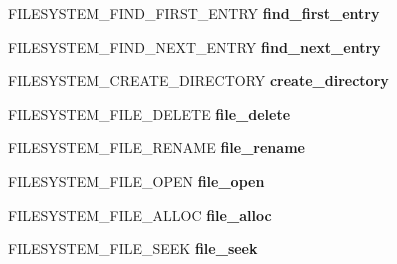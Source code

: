 \begin{DoxyCompactItemize}
\item 
\hypertarget{struct_f_i_l_e_s_y_s_t_e_m_a9abd7d16a342ddce70301d93b71037b1}{F\-I\-L\-E\-S\-Y\-S\-T\-E\-M\-\_\-\-F\-I\-N\-D\-\_\-\-F\-I\-R\-S\-T\-\_\-\-E\-N\-T\-R\-Y {\bfseries find\-\_\-first\-\_\-entry}}\label{struct_f_i_l_e_s_y_s_t_e_m_a9abd7d16a342ddce70301d93b71037b1}

\item 
\hypertarget{struct_f_i_l_e_s_y_s_t_e_m_a1075f67098ed5367a708608d7c8edad2}{F\-I\-L\-E\-S\-Y\-S\-T\-E\-M\-\_\-\-F\-I\-N\-D\-\_\-\-N\-E\-X\-T\-\_\-\-E\-N\-T\-R\-Y {\bfseries find\-\_\-next\-\_\-entry}}\label{struct_f_i_l_e_s_y_s_t_e_m_a1075f67098ed5367a708608d7c8edad2}

\item 
\hypertarget{struct_f_i_l_e_s_y_s_t_e_m_a0950a4bfe4c8d1585385c94ace362568}{F\-I\-L\-E\-S\-Y\-S\-T\-E\-M\-\_\-\-C\-R\-E\-A\-T\-E\-\_\-\-D\-I\-R\-E\-C\-T\-O\-R\-Y {\bfseries create\-\_\-directory}}\label{struct_f_i_l_e_s_y_s_t_e_m_a0950a4bfe4c8d1585385c94ace362568}

\item 
\hypertarget{struct_f_i_l_e_s_y_s_t_e_m_afab3332d6aec8b0be5071898e2e34352}{F\-I\-L\-E\-S\-Y\-S\-T\-E\-M\-\_\-\-F\-I\-L\-E\-\_\-\-D\-E\-L\-E\-T\-E {\bfseries file\-\_\-delete}}\label{struct_f_i_l_e_s_y_s_t_e_m_afab3332d6aec8b0be5071898e2e34352}

\item 
\hypertarget{struct_f_i_l_e_s_y_s_t_e_m_a4514278dac980563c84ac03714a1916b}{F\-I\-L\-E\-S\-Y\-S\-T\-E\-M\-\_\-\-F\-I\-L\-E\-\_\-\-R\-E\-N\-A\-M\-E {\bfseries file\-\_\-rename}}\label{struct_f_i_l_e_s_y_s_t_e_m_a4514278dac980563c84ac03714a1916b}

\item 
\hypertarget{struct_f_i_l_e_s_y_s_t_e_m_afa011336c4eb6ea5ac1888c5c7bbf352}{F\-I\-L\-E\-S\-Y\-S\-T\-E\-M\-\_\-\-F\-I\-L\-E\-\_\-\-O\-P\-E\-N {\bfseries file\-\_\-open}}\label{struct_f_i_l_e_s_y_s_t_e_m_afa011336c4eb6ea5ac1888c5c7bbf352}

\item 
\hypertarget{struct_f_i_l_e_s_y_s_t_e_m_a23c3450056aec1c002ed6669ef0c3595}{F\-I\-L\-E\-S\-Y\-S\-T\-E\-M\-\_\-\-F\-I\-L\-E\-\_\-\-A\-L\-L\-O\-C {\bfseries file\-\_\-alloc}}\label{struct_f_i_l_e_s_y_s_t_e_m_a23c3450056aec1c002ed6669ef0c3595}

\item 
\hypertarget{struct_f_i_l_e_s_y_s_t_e_m_a727e7a8a228b2e47af23ce209ef861f6}{F\-I\-L\-E\-S\-Y\-S\-T\-E\-M\-\_\-\-F\-I\-L\-E\-\_\-\-S\-E\-E\-K {\bfseries file\-\_\-seek}}\label{struct_f_i_l_e_s_y_s_t_e_m_a727e7a8a228b2e47af23ce209ef861f6}


\end{DoxyCompactItemize}
